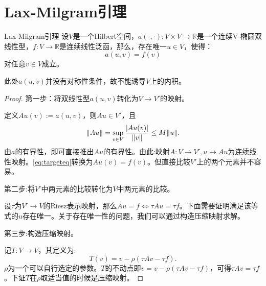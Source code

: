 \section{Lax-Milgram引理}
\begin{theorem}{Lax-Milgram引理}
  设$V$是一个Hilbert空间，$a(\cdot,\cdot):V\times V\rightarrow\mathbb{R}$是一个连续V-椭圆双线性型，$f:V\rightarrow\mathbb{R}$是连续线性泛函，那么，存在唯一$u\in V$，使得：
  \begin{equation}
    \label{eq:targeteq}
    a(u,v)=f(v)
  \end{equation}
  对任意$v\in V$成立。
\end{theorem}
\begin{remark}
  此处$a(u,v)$并没有对称性条件，故不能诱导$V$上的内积。
\end{remark}
\begin{proof}
  第一步：将双线性型$a(u,v)$转化为$V\rightarrow V'$的映射。

  定义$Au(v):=a(u,v)$，则$Au\in V'$，且
  \begin{equation}
    \|Au\|=\sup_{v\in V}\frac{|Au(v)|}{\|v\|}\le M\|u\|.
  \end{equation}
  由$a$的有界性，即可直接推出$Au$的有界性。由此:映射$A:V\rightarrow V',u\mapsto Au$为连续线性映射。\eqref{eq:targeteq}转换为$Au(v)=f(v)$。但直接比较$V'$上的两个元素并不容易。

  第二步:将$V'$中两元素的比较转化为$V$中两元素的比较。

  设$\tau$为$V'\rightarrow V$的Riesz表示映射，那么$Au=f\Leftrightarrow\tau Au=\tau f$。下面需要证明满足该等式的$u$存在唯一。关于存在唯一性的问题，我们可以通过构造压缩映射求解。

  第三步:构造压缩映射。

  记$T:V\rightarrow V$，其定义为:
  \begin{equation}
    T(v)=v-\rho(\tau Av-\tau f).
  \end{equation}
  $\rho$为一个可以自行选定的参数。$T$的不动点即$v=v-\rho(\tau Av-\tau f)$，可得$\tau Av=\tau f$。下证$T$在$\rho$取适当值的时候是压缩映射。


\end{proof}
